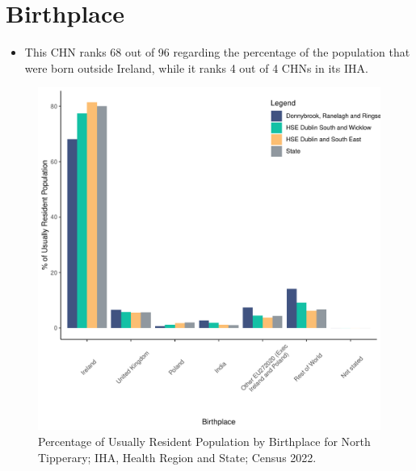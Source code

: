 \documentclass{article}
\begin{document}
\section{Birthplace}\label{sect:Birth}
\begin{itemize}
\item This CHN ranks  68 out of 96 regarding the percentage of the population that were born outside Ireland, while it ranks  4 out of 4 CHNs in its IHA.
\end{itemize}
\begin{figure}[H]
	\centering
	\includegraphics[width = 130mm]{../figures/BirthED.pdf}
	\caption{Percentage of Usually Resident Population by Birthplace for North Tipperary; IHA, Health Region and State; Census 2022.}
	\label{fig:vbnv}
	\end{figure}
	
\end{document}
